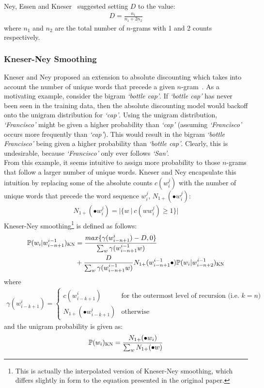 \documentclass[a4paper, 12pt]{report}
\newcommand{\tit}[1]{\textit{#1}}
\begin{document}
Ney, Essen and Kneser~\cite{absolute_discounting:ney1994} suggested setting $D$ to the value:
\begin{gather} \label{eq:discount}
	D = \frac{n_1}{n_1 + 2n_2}
\end{gather}
where $n_1$ and $n_2$ are the total number of $n$-grams with 1 and 2 counts respectively.

\subsubsection{Kneser-Ney Smoothing}

Kneser and Ney proposed an extension to absolute discounting which takes into account the number of unique words that precede a given $n$-gram~\cite{kneser_ney_smoothing:kneser1995}. As a motivating example, consider the bigram \tit{`bottle cap'}. If \tit{`bottle cap'} has never been seen in the training data, then the absolute discounting model would backoff onto the unigram distribution for \tit{`cap'}. Using the unigram distribution, \tit{`Francisco'} might be given a higher probability than \tit{`cap'} (assuming \tit{`Francisco'} occurs more frequently than \tit{`cap'}). This would result in the bigram \tit{`bottle Francisco'} being given a higher probability than \tit{`bottle cap'}. Clearly, this is undesirable, because \tit{`Francisco'} only ever follows \tit{`San'}. \\

From this example, it seems intuitive to assign more probability to those $n$-grams that follow a larger number of unique words. Kneser and Ney encapsulate this intuition by replacing some of the absolute counts $c(w_i^j)$ with the number of unique words that precede the word sequence $w_i^j$, $N_{1+}(\bullet w_i^j)$:
\begin{gather}
	N_{1+}(\bullet w_i^j) = |\{w\ |\ c(ww_i^j) \geq 1\}|
\end{gather}
Kneser-Ney smoothing\footnote{This is actually the interpolated version of Kneser-Ney smoothing, which differs slightly in form to the equation presented in the original paper.} is defined as follows:
\begin{align}
	\mathbb{P}(w_i | w_{i - n + 1}^{i - 1})_{\text{\scshape KN}} &= \frac{max\{\gamma(w_{i - n + 1}^{i}) - D, 0\}}{\sum_w \gamma(w_{i - n + 1}^{i - 1}w)} \\
	&+ \frac{D}{\sum_w \gamma(w_{i - n + 1}^{i - 1}w)}N_{1+}(w_{i - n + 1}^{i - 1}\bullet)\mathbb{P}(w_i | w_{i - n + 2}^{i - 1})_{\text{\scshape KN}}
\end{align}
where
\begin{gather} \label{eq:gamma}
	\gamma(w_{i - k + 1}^i) = \begin{cases}
		c(w_{i - k + 1}^i) &\text{for the outermost level of recursion (i.e. $k = n$)} \\
		N_{1+}(\bullet w_{i - k + 1}^i) &\text{otherwise}
	\end{cases}
\end{gather}
and the unigram probability is given as:
\begin{gather}
	\mathbb{P}(w_i)_{\text{\scshape KN}} = \frac{N_{1+}(\bullet w_i)}{\sum_w N_{1+}(\bullet w)}
\end{gather}
\end{document}

